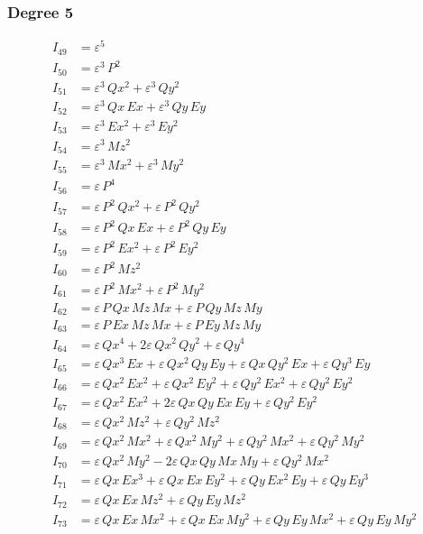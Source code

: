 \documentclass{article}
\begin{document}
\subsubsection*{Degree 5}

\begin{align*}
I_{49} &= ε^{5} \\
I_{50} &= ε^{3}\,P^{2} \\
I_{51} &= ε^{3}\,Qx^{2} + ε^{3}\,Qy^{2} \\
I_{52} &= ε^{3}\,Qx\,Ex + ε^{3}\,Qy\,Ey \\
I_{53} &= ε^{3}\,Ex^{2} + ε^{3}\,Ey^{2} \\
I_{54} &= ε^{3}\,Mz^{2} \\
I_{55} &= ε^{3}\,Mx^{2} + ε^{3}\,My^{2} \\
I_{56} &= ε\,P^{4} \\
I_{57} &= ε\,P^{2}\,Qx^{2} + ε\,P^{2}\,Qy^{2} \\
I_{58} &= ε\,P^{2}\,Qx\,Ex + ε\,P^{2}\,Qy\,Ey \\
I_{59} &= ε\,P^{2}\,Ex^{2} + ε\,P^{2}\,Ey^{2} \\
I_{60} &= ε\,P^{2}\,Mz^{2} \\
I_{61} &= ε\,P^{2}\,Mx^{2} + ε\,P^{2}\,My^{2} \\
I_{62} &= ε\,P\,Qx\,Mz\,Mx + ε\,P\,Qy\,Mz\,My \\
I_{63} &= ε\,P\,Ex\,Mz\,Mx + ε\,P\,Ey\,Mz\,My \\
I_{64} &= ε\,Qx^{4} + 2ε\,Qx^{2}\,Qy^{2} + ε\,Qy^{4} \\
I_{65} &= ε\,Qx^{3}\,Ex + ε\,Qx^{2}\,Qy\,Ey + ε\,Qx\,Qy^{2}\,Ex + ε\,Qy^{3}\,Ey \\
I_{66} &= ε\,Qx^{2}\,Ex^{2} + ε\,Qx^{2}\,Ey^{2} + ε\,Qy^{2}\,Ex^{2} + ε\,Qy^{2}\,Ey^{2} \\
I_{67} &= ε\,Qx^{2}\,Ex^{2} + 2ε\,Qx\,Qy\,Ex\,Ey + ε\,Qy^{2}\,Ey^{2} \\
I_{68} &= ε\,Qx^{2}\,Mz^{2} + ε\,Qy^{2}\,Mz^{2} \\
I_{69} &= ε\,Qx^{2}\,Mx^{2} + ε\,Qx^{2}\,My^{2} + ε\,Qy^{2}\,Mx^{2} + ε\,Qy^{2}\,My^{2} \\
I_{70} &= ε\,Qx^{2}\,My^{2} - 2ε\,Qx\,Qy\,Mx\,My + ε\,Qy^{2}\,Mx^{2} \\
I_{71} &= ε\,Qx\,Ex^{3} + ε\,Qx\,Ex\,Ey^{2} + ε\,Qy\,Ex^{2}\,Ey + ε\,Qy\,Ey^{3} \\
I_{72} &= ε\,Qx\,Ex\,Mz^{2} + ε\,Qy\,Ey\,Mz^{2} \\
I_{73} &= ε\,Qx\,Ex\,Mx^{2} + ε\,Qx\,Ex\,My^{2} + ε\,Qy\,Ey\,Mx^{2} + ε\,Qy\,Ey\,My^{2} \\

\end{align*}
\end{document}

